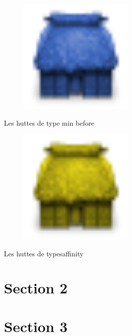 \begin{minipage}[H]{0.1\linewidth}
  \begin{figure}[H]
    \begin{center}
      \includegraphics[width=0.5\textwidth]{./img/hut_min_before}
    \end{center}
  \end{figure}
\end{minipage}
\begin{minipage}[H]{0.9\linewidth}
  Les huttes de type \og{}min before\fg{}
\end{minipage}

\begin{minipage}[H]{0.1\linewidth}
  \begin{figure}[H]
    \begin{center}
      \includegraphics[width=0.5\textwidth]{./img/hut_affinity}
    \end{center}
  \end{figure}
\end{minipage}
\begin{minipage}[H]{0.9\linewidth}
  Les huttes de types\og{}affinity\fg{}
\end{minipage}


\section{Section 2}
\section{Section 3}
